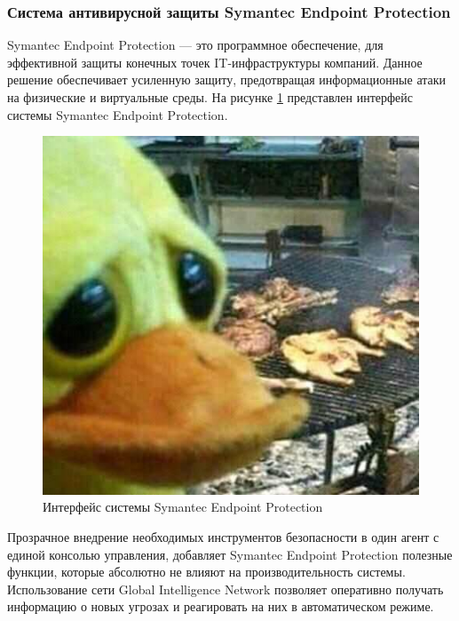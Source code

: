 \subsubsection{Система антивирусной защиты Symantec Endpoint Protection}
Symantec Endpoint Protection — это программное обеспечение, для эффективной защиты конечных точек IT-инфраструктуры компаний. Данное решение обеспечивает усиленную защиту, предотвращая информационные атаки на физические и виртуальные среды. На рисунке \ref{Symantec} представлен интерфейс системы Symantec Endpoint Protection.

\begin{figure}[H]
  \centering
  \includegraphics[width=1\textwidth]{resources/3.jpg}
  \caption{Интерфейс системы Symantec Endpoint Protection}
  \label{Symantec}
\end{figure}

Прозрачное внедрение необходимых инструментов безопасности в один агент с единой консолью управления, добавляет Symantec Endpoint Protection полезные функции, которые абсолютно не влияют на производительность системы. Использование сети Global Intelligence Network позволяет оперативно получать информацию о новых угрозах и реагировать на них в автоматическом режиме.

